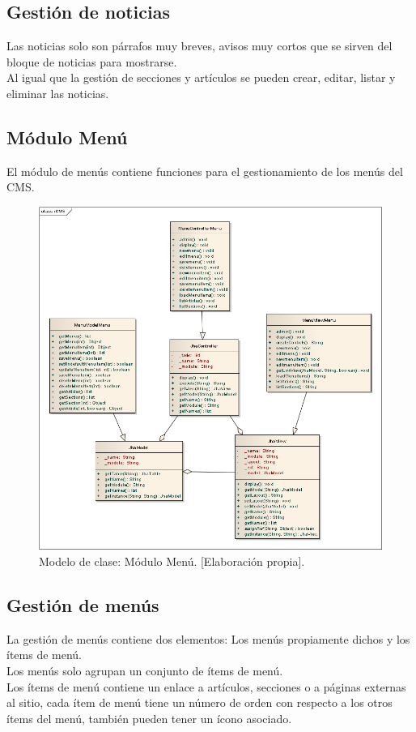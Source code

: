 \subsection{Gesti\'on de noticias}
Las noticias solo son p\'arrafos muy breves, avisos muy cortos que se sirven del bloque de noticias para mostrarse.\\
Al igual que la gesti\'on de secciones y art\'iculos se pueden crear, editar, listar y eliminar las noticias.

\newpage
\subsection{M\'odulo Men\'u}
El m\'odulo de men\'us contiene funciones para el gestionamiento de los men\'us del CMS.

\begin{figure}[h]
\centering
\includegraphics[scale=.4, keepaspectratio=true]{imagenes/15_imagen.png}
\caption{Modelo de clase: M\'odulo Men\'u. [Elaboraci\'on propia].}
\end{figure}

\subsection{Gesti\'on de men\'us}
La gesti\'on de men\'us contiene dos elementos: Los men\'us propiamente dichos y los \'items de men\'u.\\
Los men\'us solo agrupan un conjunto de \'items de men\'u.\\
Los \'items de men\'u contiene un enlace a art\'iculos, secciones o a p\'aginas externas al sitio, cada \'item de men\'u tiene un n\'umero de orden con respecto a los otros \'items del men\'u, tambi\'en pueden tener un \'icono asociado.

